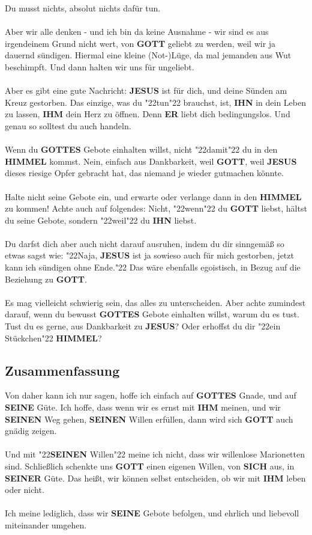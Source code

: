 \documentclass[12pt,a5paper]{article}
\newcommand{\Er}[0]{\textbf{ER}}
\newcommand{\Gottes}[0]{\textbf{GOTTES}}
\newcommand{\Gott}[0]{\textbf{GOTT}}
\newcommand{\Himmel}[0]{\textbf{HIMMEL}}
\newcommand{\Ihm}[0]{\textbf{IHM}}
\newcommand{\Ihn}[0]{\textbf{IHN}}
\newcommand{\Jesus}[0]{\textbf{JESUS}}
\newcommand{\Seinen}[0]{\textbf{SEINEN}}
\newcommand{\Seiner}[0]{\textbf{SEINER}}
\newcommand{\Seine}[0]{\textbf{SEINE}}
\newcommand{\Sich}[0]{\textbf{SICH}}
\newcommand{\q}[1]{\char"22{#1}\char"22 }
\begin{document}
		Du musst nichts,
		absolut nichts daf\"ur tun.
		\\
		\\
		Aber wir alle denken
		- und ich bin da keine Ausnahme
		- wir sind es aus irgendeinem Grund nicht wert,
		von {\Gott} geliebt zu werden,
		weil wir ja dauernd s\"undigen.
		Hiermal eine kleine (Not-)L\"uge,
		da mal jemanden aus Wut beschimpft.
		Und dann halten wir uns f\"ur ungeliebt.
		\\
		\\
		Aber es gibt eine gute Nachricht:
		{\Jesus} ist f\"ur dich,
		und deine S\"unden am Kreuz gestorben.
		Das einzige,
		was du \q{tun} brauchst,
		ist,
		{\Ihn} in dein Leben zu lassen,
		{\Ihm} dein Herz zu \"offnen.
		Denn {\Er} liebt dich bedingungslos.
		Und genau so solltest du auch handeln.
		\\
		\\
		Wenn du {\Gottes} Gebote einhalten willst,
		nicht \q{damit} du in den {\Himmel} kommst.
		Nein,
		einfach aus Dankbarkeit,
		weil {\Gott},
		weil {\Jesus} dieses riesige Opfer gebracht hat,
		das niemand je wieder gutmachen k\"onnte.
		\\
		\\
		Halte nicht seine Gebote ein,
		und erwarte oder verlange dann in den {\Himmel} zu kommen!
		Achte auch auf folgendes:
		Nicht,
		\q{wenn} du {\Gott} liebst, h\"altst du seine Gebote,
		sondern \q{weil} du {\Ihn} liebst.
		\\
		\\
		Du darfst dich aber auch nicht darauf ausruhen,
		indem du dir sinngem\"a{\ss} so etwas sagst wie:
		\q{Naja,
		{\Jesus} ist ja sowieso auch f\"ur mich gestorben,
		jetzt kann ich s\"undigen ohne Ende.}
		Das w\"are ebenfalls egoistisch,
		in Bezug auf die Beziehung zu {\Gott}.
		\\
		\\
		Es mag vielleicht schwierig sein,
		das alles zu unterscheiden.
		Aber achte zumindest darauf,
		wenn du bewusst {\Gottes} Gebote einhalten willst,
		warum du es tust.
		Tust du es gerne,
		aus Dankbarkeit zu {\Jesus}?
		Oder erhoffst du dir \q{ein St\"uckchen} {\Himmel}?

	\newpage
	\subsection{Zusammenfassung}
		Von daher kann ich nur sagen,
		hoffe ich einfach auf {\Gottes} Gnade,
		und auf {\Seine} G\"ute.
		Ich hoffe,
		dass wenn wir es ernst mit {\Ihm} meinen,
		und wir {\Seinen} Weg gehen,
		{\Seinen} Willen erf\"ullen,
		dann wird sich {\Gott} auch gn\"adig zeigen.
		\\
		\\
		Und mit \q{{\Seinen} Willen} meine ich nicht,
		dass wir willenlose Marionetten sind.
		Schlie{\ss}lich schenkte uns {\Gott} einen eigenen Willen,
		von {\Sich} aus,
		in {\Seiner} G\"ute.
		Das hei{\ss}t,
		wir k\"onnen selbst entscheiden,
		ob wir mit {\Ihm} leben oder nicht.
		\\
		\\
		Ich meine lediglich,
		dass wir {\Seine} Gebote befolgen,
		und ehrlich und liebevoll miteinander umgehen.
\end{document}
